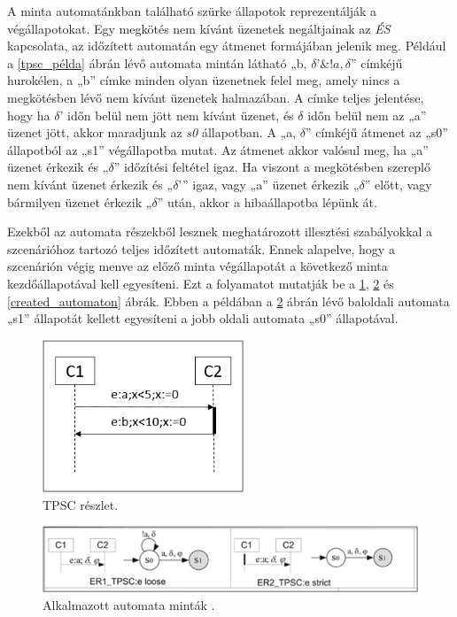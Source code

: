 A minta automatánkban található szürke állapotok reprezentálják a végállapotokat.
Egy megkötés nem kívánt üzenetek negáltjainak az \textit{ÉS} kapcsolata, az időzített automatán egy átmenet formájában jelenik meg.
Például a \ref{tpsc_példa} ábrán lévő automata mintán látható „b, $\delta ’\&!a, \delta$” címkéjű hurokélen, a „b” címke minden olyan üzenetnek felel meg, amely nincs a megkötésben lévő nem kívánt üzenetek halmazában.
A címke teljes jelentése, hogy ha $\delta$’ időn belül nem jött nem kívánt üzenet, és $\delta$ időn belül nem az „a” üzenet jött, akkor maradjunk az \textit{s0} állapotban.
A „a, $\delta$” címkéjű átmenet az „s0” állapotból az „s1” végállapotba mutat.
Az átmenet akkor valósul meg, ha „a” üzenet érkezik és „$\delta$” időzítési feltétel igaz.
Ha viszont a megkötésben szereplő nem kívánt üzenet érkezik és „$\delta$’” igaz, vagy „a” üzenet érkezik „$\delta$” előtt, vagy bármilyen üzenet érkezik „$\delta$” után, akkor a hibaállapotba lépünk át.

Ezekből az automata részekből lesznek meghatározott illesztési szabályokkal a szcenárióhoz tartozó teljes időzített automaták.
Ennek alapelve, hogy a szcenárión végig menve az előző minta végállapotát a következő minta kezdőállapotával kell egyesíteni.
Ezt a folyamatot mutatják be a \ref{tpsc_subset}, \ref{tpsc_used_patterns} és \ref{created_automaton} ábrák.
Ebben a példában a \ref{tpsc_used_patterns} ábrán lévő baloldali automata „s1” állapotát kellett egyesíteni a jobb oldali automata „s0” állapotával.

\begin{figure}[!ht]
    \centering
    \includegraphics[width=60mm, keepaspectratio]{figures/7abra.png}
    \caption{TPSC részlet.}
    \label{tpsc_subset}
\end{figure}

\begin{figure}[!ht]
    \centering
    \includegraphics[width=150mm, keepaspectratio]{figures/8abra.png}
    \caption{Alkalmazott automata minták \cite{TPSC1}.}
    \label{tpsc_used_patterns}
\end{figure}

